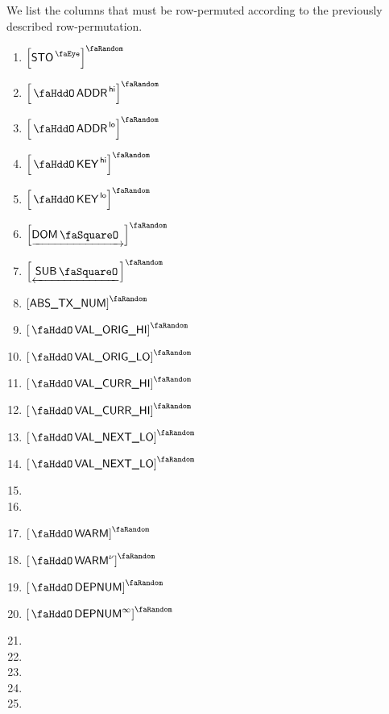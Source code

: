 We list the columns that must be row-permuted according to the previously described row-permutation.
\begin{multicols}{3}
	\begin{enumerate}
		\item $\order{\peekStorage}$
		\item $\order{\stoAddressHi}$
		\item $\order{\stoAddressLo}$
		\item $\order{\stoKeyHi}$
		\item $\order{\stoKeyLo}$
		\item $\order{\domStamp}$
		\item $\order{\subStamp}$
		\item $\order{\absTxNum}$
		\item $\order{\stoOrigValueHi}$
		\item $\order{\stoOrigValueLo}$
		\item $\order{\stoCurrValueHi}$
		\item $\order{\stoCurrValueHi}$
		\item $\order{\stoNextValueLo}$
		\item $\order{\stoNextValueLo}$
		\item[\vspace{\fill}]
		\item[\vspace{\fill}]
		\item $\order{\stoWarmth}$
		\item $\order{\stoWarmth\new}$
		\item $\order{\stoDeploymentNumber}$
		\item $\order{\stoDeploymentNumber^\infty}$
		\item[\vspace{\fill}]
		\item[\vspace{\fill}]
		\item[\vspace{\fill}]
		\item[\vspace{\fill}]
		\item[\vspace{\fill}]
	\end{enumerate}
\end{multicols}
